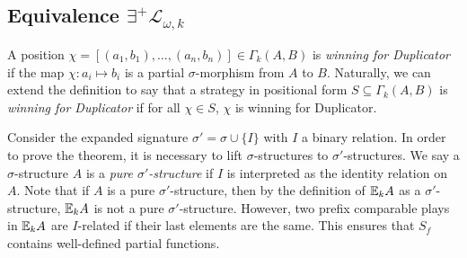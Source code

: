 \subsection{Equivalence $\exists^{+}\mathcal{L}_{\omega,k}$}
\begin{defn}
A position $\chi = [(a_{1},b_{1}),\dots,(a_{n},b_{n})] \in \Gamma_{k}(A,B)$ is \textit{winning for Duplicator} if the map $\chi:a_{i} \longmapsto b_{i}$ is a partial $\sigma$-morphism from $A$ to $B$.  
Naturally, we can extend the definition to say that a strategy in positional form $S \subseteq \Gamma_{k}(A,B)$ is \textit{winning for Duplicator} if for all $\chi \in S$, $\chi$ is winning for Duplicator. 
\end{defn}
Consider the expanded signature $\sigma' = \sigma \cup \{I\}$ with $I$ a binary relation. In order to prove the theorem, it is necessary to lift $\sigma$-structures to $\sigma'$-structures. We say a $\sigma$-structure $A$ is a \textit{pure $\sigma'$-structure} if $I$ is interpreted as the identity relation on $A$. Note that if $A$ is a pure $\sigma'$-structure, then by the definition of ${\mathbb{E}_{k}A}$ as a $\sigma'$-structure, ${\mathbb{E}_{k}A}$ is not a pure $\sigma'$-structure. However, two prefix comparable plays in ${\mathbb{E}_{k}A}$ are $I$-related if their last elements are the same. This ensures that $S_{f}$ contains well-defined partial functions.
